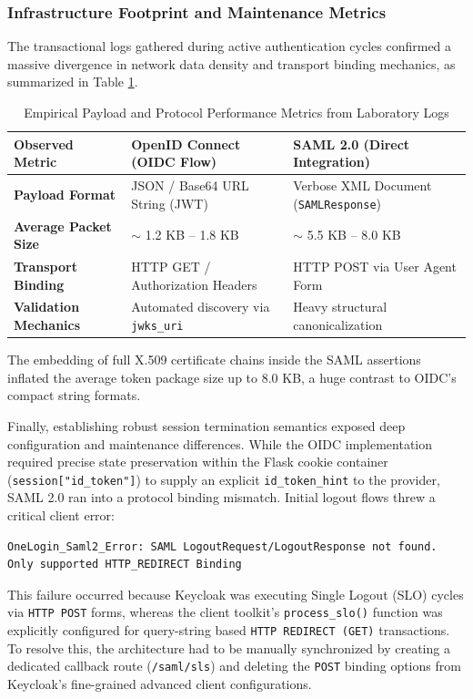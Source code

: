 \documentclass[../memoire.tex]{subfiles}
\begin{document}
\subsubsection{Infrastructure Footprint and Maintenance Metrics}

The transactional logs gathered during active authentication cycles confirmed a massive divergence in network data density and transport binding mechanics, as summarized in Table \ref{tab:laboratory_metrics}.

\begin{table}[H]
    \centering
    \begin{tabularx}{\textwidth}{@{} l | X X @{}}
        \textbf{Observed Metric} & \textbf{OpenID Connect (OIDC Flow)} & \textbf{SAML 2.0 (Direct Integration)} \\ \hline
        \textbf{Payload Format} & JSON / Base64 URL String (JWT) & Verbose XML Document (\texttt{SAMLResponse}) \\
        \textbf{Average Packet Size} & $\sim$ 1.2 KB -- 1.8 KB & $\sim$ 5.5 KB -- 8.0 KB \\
        \textbf{Transport Binding} & HTTP GET / Authorization Headers & HTTP POST via User Agent Form \\
        \textbf{Validation Mechanics} & Automated discovery via \texttt{jwks\_uri} & Heavy structural canonicalization \\
    \end{tabularx}
    \caption{Empirical Payload and Protocol Performance Metrics from Laboratory Logs}
    \label{tab:laboratory_metrics}
\end{table}

The embedding of full X.509 certificate chains inside the SAML assertions inflated the average token package size up to 8.0 KB, a huge contrast to OIDC's compact string formats. 



Finally, establishing robust session termination semantics exposed deep configuration and maintenance differences. While the OIDC implementation required precise state preservation within the Flask cookie container (\texttt{session["id\_token"]}) to supply an explicit \texttt{id\_token\_hint} to the provider, SAML 2.0 ran into a protocol binding mismatch. Initial logout flows threw a critical client error:
\begin{lstlisting}[basicstyle=\ttfamily, caption={SAML SLS Binding Mismatch}]
OneLogin_Saml2_Error: SAML LogoutRequest/LogoutResponse not found. 
Only supported HTTP_REDIRECT Binding
\end{lstlisting}
This failure occurred because Keycloak was executing Single Logout (SLO) cycles via \texttt{HTTP POST} forms, whereas the client toolkit's \texttt{process\_slo()} function was explicitly configured for query-string based \texttt{HTTP REDIRECT (GET)} transactions. To resolve this, the architecture had to be manually synchronized by creating a dedicated callback route (\texttt{/saml/sls}) and deleting the \texttt{POST} binding options from Keycloak’s fine-grained advanced client configurations.
\end{document}
